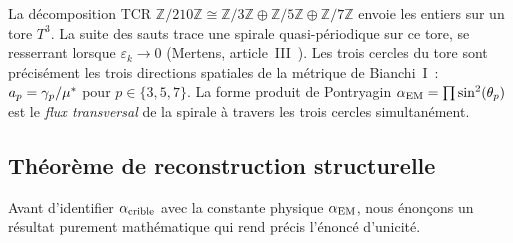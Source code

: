 \documentclass[12pt,a4paper]{article}
\begin{document}
\begin{remarque}
\label{rem:toric_spiral_metric}
La décomposition TCR
$\mathbb{Z}/210\mathbb{Z} \cong \mathbb{Z}/3\mathbb{Z} \oplus
\mathbb{Z}/5\mathbb{Z} \oplus \mathbb{Z}/7\mathbb{Z}$
envoie les entiers sur un tore $T^3$. La suite des sauts trace une
spirale quasi-périodique sur ce tore, se resserrant lorsque
$\varepsilon_k \to 0$ (Mertens, article~III~\cite{companion_M3}).
Les trois cercles du tore sont précisément les trois directions
spatiales de la métrique de Bianchi~I~: $a_p = \gamma_p / {\mu^{*}}$
pour $p \in \{3, 5, 7\}$. La forme produit de Pontryagin
$\alpha_{\mathrm{EM}} = \prod \sin^2(\theta_{p})$ est le \emph{flux transversal} de la
spirale à travers les trois cercles simultanément.
\end{remarque}

\subsection{Théorème de reconstruction structurelle}
\label{sec:ch9_reconstruction_thm}

Avant d'identifier $\alpha_{\rm crible}$ avec la constante physique
$\alpha_{\mathrm{EM}}$, nous énonçons un résultat purement mathématique qui rend
précis l'énoncé d'unicité.
\end{document}
